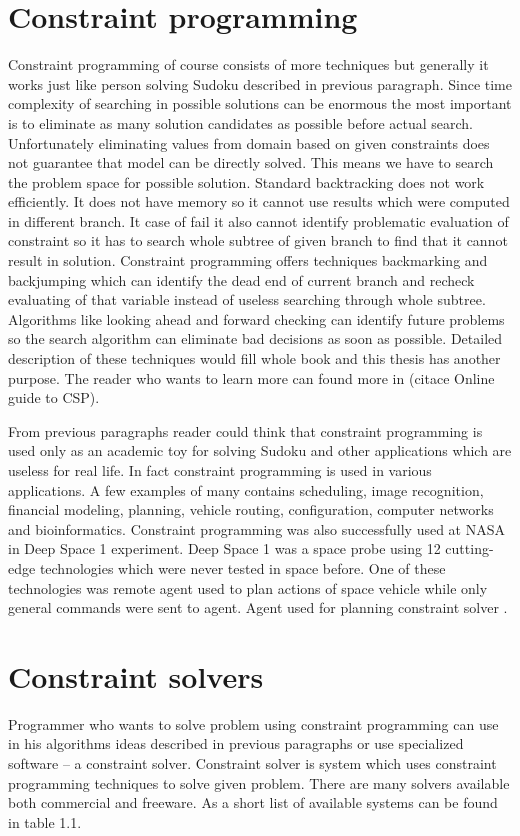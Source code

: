 \section{Constraint programming}
Constraint programming of course consists of more techniques but generally it works 
just like person solving Sudoku described in previous paragraph. Since time complexity 
of searching in possible solutions can be enormous the most important is to eliminate as 
many solution candidates as possible before actual search. Unfortunately eliminating values 
from domain based on given constraints does not guarantee that model can be directly solved. 
This means we have to search the problem space for possible solution. Standard backtracking 
does not work efficiently. It does not have memory so it cannot use results which 
were computed in different branch. It case of fail it also cannot identify problematic 
evaluation of constraint so it has to search whole subtree of given branch to find 
that it cannot result in solution. Constraint programming offers techniques backmarking 
and backjumping which can identify the dead end of current branch and recheck evaluating 
of that variable instead of useless searching through whole subtree. Algorithms 
like looking ahead and forward checking can identify future problems so the search 
algorithm can eliminate bad decisions as soon as possible. Detailed description 
of these techniques would fill whole book and this thesis has another purpose. 
The reader who wants to learn more can found more in (citace Online guide to CSP).

From previous paragraphs reader could think that constraint programming is used 
only as an academic toy for solving Sudoku and other applications which are useless 
for real life. In fact constraint programming is used in various applications. 
A few examples of many contains scheduling, image recognition, financial modeling, 
planning, vehicle routing, configuration, computer networks and bioinformatics. 
Constraint programming was also successfully used at NASA in Deep Space 1 experiment. 
Deep Space 1 was a space probe using 12 cutting-edge technologies which were never 
tested in space before. One of these technologies was remote agent used to plan 
actions of space vehicle while only general commands were sent to agent. Agent 
used for planning constraint solver \cite{nasa:ds1-ara}.

\section{Constraint solvers}
Programmer who wants to solve problem using constraint programming can use in his 
algorithms ideas described in previous paragraphs or use specialized software -- a 
constraint solver. Constraint solver is system which uses constraint programming 
techniques to solve given problem. There are many solvers available both commercial 
and freeware. As a short list of available systems can be found in table 1.1.


